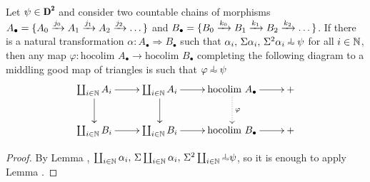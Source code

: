 \begin{lemma}\label{horth_colimits}
Let $\psi\in\cD^\due$ and consider two countable chains of morphisms $A_\bullet = \{A_0\xrightarrow{j_0}A_1\xrightarrow{j_1}A_2\xrightarrow{j_2}\dots\}$ and $B_\bullet = \{B_0\xrightarrow{k_0}B_1\xrightarrow{k_1}B_2\xrightarrow{k_2}\dots\}$.  If there is a natural transformation $\alpha\colon A_\bullet \Rightarrow B_\bullet$ such that $\alpha_i,\, \Sigma \alpha_i,\, \Sigma^2 \alpha_i\horth \psi$ for all $i\in\mathbb{N}$, then any map $\varphi\colon  \text{hocolim } A_\bullet\to  \text{hocolim } B_\bullet$ completing the following diagram to a middling good map of triangles is such that $\varphi\horth \psi$
\[
\xymatrix{
	\coprod_{i\in\N} A_i \ar[d]\ar[r] & \coprod_{i\in\N} A_i \ar[d]\ar[r] & \text{hocolim } A_\bullet \ar[r]\ar@{.>}[d]^{\varphi} & +\\
	\coprod_{i\in\N} B_i \ar[r] & \coprod_{i\in\N} B_i \ar[r] & \text{hocolim } B_\bullet \ar[r] & +
}
\]
\end{lemma}
\begin{proof}
By Lemma , $\coprod_{i\in\N} \alpha_i,\, \Sigma\coprod_{i\in\N} \alpha_i,\, \Sigma^2\coprod_{i\in\N}\horth \psi$, so it is enough to apply Lemma .
\end{proof}
